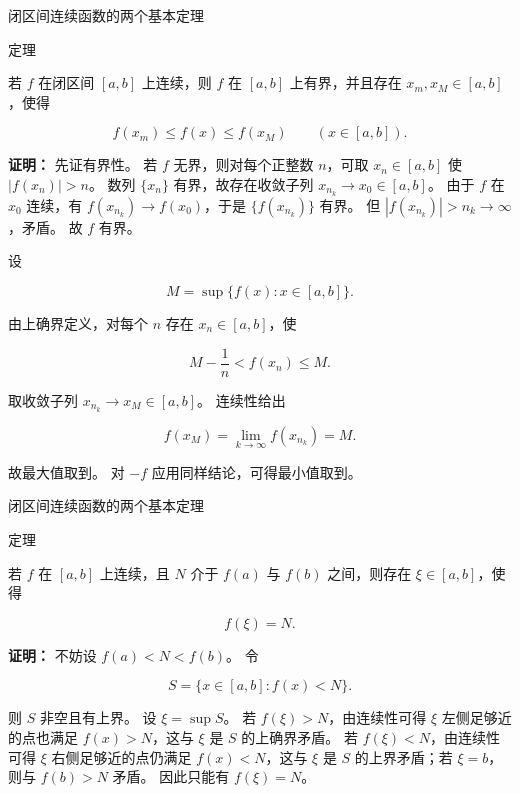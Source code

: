 \documentclass[aspectratio=169,10pt,fontset=fandol]{ctexbeamer}
\begin{document}
\begin{frame}[t,fragile]{闭区间连续函数的两个基本定理}
\normalsize
\begin{block}{定理}
{\normalsize


若 $f$ 在闭区间 $[a,b]$ 上连续，则 $f$ 在 $[a,b]$ 上有界，并且存在 $x_m,x_M\in[a,b]$，使得

\[

f(x_m)\le f(x)\le f(x_M)\qquad (x\in[a,b]).

\]


}
\end{block}
\pause
{\normalsize
\textbf{证明：}
先证有界性。 若 $f$ 无界，则对每个正整数 $n$，可取 $x_n\in[a,b]$ 使 $|f(x_n)|>n$。 数列 $\{x_n\}$ 有界，故存在收敛子列 $x_{n_k}\to x_0\in[a,b]$。 由于 $f$ 在 $x_0$ 连续，有 $f(x_{n_k})\to f(x_0)$，于是 $\{f(x_{n_k})\}$ 有界。 但 $|f(x_{n_k})|>n_k\to\infty$，矛盾。 故 $f$ 有界。



设

\[

M=\sup\{f(x):x\in[a,b]\}.

\]

由上确界定义，对每个 $n$ 存在 $x_n\in[a,b]$，使

\[

M-\frac1n<f(x_n)\le M.

\]

取收敛子列 $x_{n_k}\to x_M\in[a,b]$。 连续性给出

\[

f(x_M)=\lim_{k\to\infty}f(x_{n_k})=M.

\]

故最大值取到。 对 $-f$ 应用同样结论，可得最小值取到。


}
\end{frame}
\begin{frame}[t,fragile]{闭区间连续函数的两个基本定理}
\normalsize
\begin{block}{定理}
{\normalsize


若 $f$ 在 $[a,b]$ 上连续，且 $N$ 介于 $f(a)$ 与 $f(b)$ 之间，则存在 $\xi\in[a,b]$，使得

\[

f(\xi)=N.

\]


}
\end{block}
\pause
{\normalsize
\textbf{证明：}
不妨设 $f(a)<N<f(b)$。 令

\[

S=\{x\in[a,b]:f(x)<N\}.

\]

则 $S$ 非空且有上界。 设 $\xi=\sup S$。 若 $f(\xi)>N$，由连续性可得 $\xi$ 左侧足够近的点也满足 $f(x)>N$，这与 $\xi$ 是 $S$ 的上确界矛盾。 若 $f(\xi)<N$，由连续性可得 $\xi$ 右侧足够近的点仍满足 $f(x)<N$，这与 $\xi$ 是 $S$ 的上界矛盾；若 $\xi=b$，则与 $f(b)>N$ 矛盾。 因此只能有 $f(\xi)=N$。


}
\end{frame}
\end{document}
